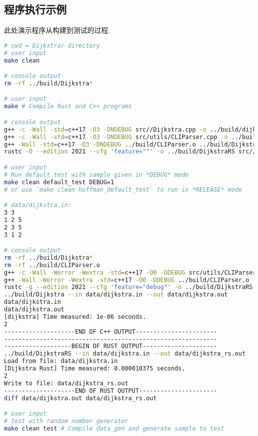 \subsection{程序执行示例}
此处演示程序从构建到测试的过程.
\begin{lstlisting}[language=bash]
# cwd = Dijkstra/ directory
# user input
make clean

# console output
rm -rf ../build/Dijkstra*

# user input
make # Compile Rust and C++ programs

# console output
g++ -c -Wall -std=c++17 -O3 -DNDEBUG src//Dijkstra.cpp -o ../build/dijkstra.o
g++ -c -Wall -std=c++17 -O3 -DNDEBUG src/utils/CLIParser.cpp -o ../build/CLIParser.o
g++ -Wall -std=c++17 -O3 -DNDEBUG ../build/CLIParser.o ../build/Dijkstra.o -o ../build/Dijkstra
rustc -O --edition 2021 --cfg 'feature=""' -o ../build/DijkstraRS src//main.rs

# user input
# Run default test with sample given in *DEBUG* mode
make clean default_test DEBUG=1
# or use `make clean huffman_default_test` to run in *RELEASE* mode

# data/dijkstra.in:
3 3
1 2 5
2 3 5
3 1 2

# console output
rm -rf ../build/Dijkstra*
rm -rf ../build/CLIParser.o
g++ -c -Wall -Werror -Wextra -std=c++17 -O0 -DDEBUG src/utils/CLIParser.cpp -o ../build/CLIParser.o
g++ -Wall -Werror -Wextra -std=c++17 -O0 -DDEBUG ../build/CLIParser.o ../build/Dijkstra.o -o ../build/Dijkstra
rustc -g --edition 2021 --cfg 'feature="debug"' -o ../build/DijkstraRS src//main.rs
../build/Dijkstra --in data/dijkstra.in --out data/dijkstra.out
data/dijkstra.in
data/dijkstra.out
[dijkstra] Time measured: 1e-06 seconds.
2
--------------------END OF C++ OUTPUT-----------------------
------------------------------------------------------------
-------------------BEGIN OF RUST OUTPUT---------------------
../build/DijkstraRS --in data/dijkstra.in --out data/dijkstra_rs.out
Load from file: data/dijkstra.in
[Dijkstra Rust] Time measured: 0.000010375 seconds.
2
Write to file: data/dijkstra_rs.out
--------------------END OF RUST OUTPUT----------------------
diff data/dijkstra.out data/dijkstra_rs.out

# user input
# test with random number generator
make clean test # Compile data_gen and generate sample to test


\end{lstlisting}
